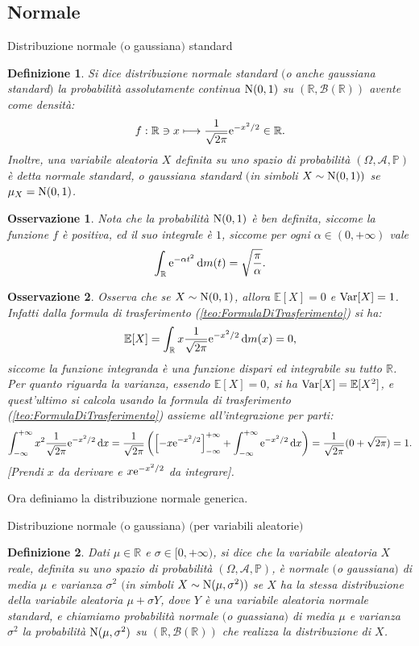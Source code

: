 \documentclass[11pt]{book}
\theoremstyle{Definizione}
\newtheorem*{mydef}{Definizione}
\theoremstyle{TeoremaProposizioneLemmaCorollario}
\theoremstyle{OsservazioneNota}
\newtheorem{myobs}{Osservazione}[section]
\newcommand{\R}{\mathbb{R}}
\renewcommand{\P}{\mathbb{P}}
\renewcommand{\d}{\mathrm{d}}
\newcommand{\dx}{\,\d x}
\newcommand{\e}{\textup{e}}
\newcommand{\E}{\mathbb{E}}
\newcommand{\Var}{\textup{Var}}
\begin{document}
\subsection{Normale}
\begin{boxdef}{Distribuzione normale $($o gaussiana$)$ standard}
\begin{mydef}
Si dice distribuzione normale standard $($o anche gaussiana standard$)$ la probabilità assolutamente continua $\textup{N}(0,1)$ su $(\R,\mathcal{B}(\R))$ avente come densità:
$$
f:\R \ni x \longmapsto \frac{1}{\sqrt{2\pi}}\e^{-x^2/2}\in \R.
$$
Inoltre, una variabile aleatoria $X$ definita su uno spazio di probabilità $(\Omega,\mathcal{A},\P)$ è detta normale standard, o gaussiana standard $($in simboli $X \sim \textup{N}(0,1))$ se $\mu_X = \textup{N}(0,1)$.
\end{mydef}
\end{boxdef}
\begin{myobs}
Nota che la probabilità $\textup{N}(0,1)$ è ben definita, siccome la funzione $f$ è positiva, ed il suo integrale è $1$, siccome per ogni $\alpha\in (0,+\infty)$ vale
$$
\int_\R \e^{-\alpha t^2} \, \d m(t) = \sqrt{\frac{\pi}{\alpha}}.
$$
\end{myobs}
\begin{myobs}
Osserva che se $X\sim \textup{N}(0,1)$, allora $\E[X] = 0$ e $\Var[X] = 1$.\\
Infatti dalla formula di trasferimento (\ref{teo:FormulaDiTrasferimento}) si ha:
$$
\E[X] = \int_\R x \frac{1}{\sqrt{2\pi}}\e^{-x^2/2}\, \d m(x) = 0,
$$
siccome la funzione integranda è una funzione dispari ed integrabile su tutto $\R$. Per quanto riguarda la varianza, essendo $\E[X] = 0$, si ha $\Var[X] = \E[X^2]$, e quest'ultimo si calcola usando la formula di trasferimento (\ref{teo:FormulaDiTrasferimento}) assieme all'integrazione per parti:
$$
\int_{-\infty}^{+\infty} x^2 \frac{1}{\sqrt{2\pi}}\e^{-x^2/2}\dx = \frac{1}{\sqrt{2\pi}}\left(\left[-x\e^{-x^2/2}\right]_{-\infty}^{+\infty}+\int_{-\infty}^{+\infty} \e^{-x^2/2}\dx\right) = \frac{1}{\sqrt{2\pi}}(0+\sqrt{2\pi}) = 1.
$$
[Prendi $x$ da derivare e $x\e^{-x^2/2}$ da integrare].
\end{myobs}
Ora definiamo la distribuzione normale generica.
\begin{boxdef}{Distribuzione normale $($o gaussiana$)$ $($per variabili aleatorie$)$}
\begin{mydef}
Dati $\mu\in \R$ e $\sigma\in [0,+\infty)$, si dice che la variabile aleatoria $X$ reale, definita su uno spazio di probabilità $(\Omega,\mathcal{A},\P)$, è normale $($o gaussiana$)$ di media $\mu$ e varianza $\sigma^2$ $($in simboli $X \sim \textup{N}(\mu,\sigma^2))$ se $X$ ha la stessa distribuzione della variabile aleatoria $\mu+\sigma Y$, dove $Y$ è una variabile aleatoria normale standard, e chiamiamo probabilità normale $($o guassiana$)$ di media $\mu$ e varianza $\sigma^2$ la probabilità $\textup{N}(\mu,\sigma^2)$ su $(\R,\mathcal{B}(\R))$ che realizza la distribuzione di $X$.
\end{mydef}
\end{boxdef}
\end{document}
